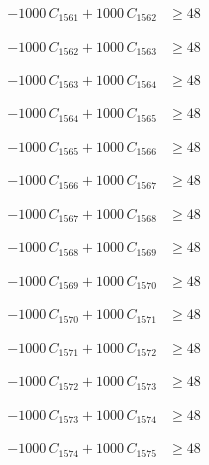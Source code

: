 \documentclass[a4paper,11pt]{article}
\begin{document}
\begin{align}
-1000\,C_{1561} + 1000\,C_{1562} &\geq 48 \nonumber
\end{align}

\begin{align}
-1000\,C_{1562} + 1000\,C_{1563} &\geq 48 \nonumber
\end{align}

\begin{align}
-1000\,C_{1563} + 1000\,C_{1564} &\geq 48 \nonumber
\end{align}

\begin{align}
-1000\,C_{1564} + 1000\,C_{1565} &\geq 48 \nonumber
\end{align}

\begin{align}
-1000\,C_{1565} + 1000\,C_{1566} &\geq 48 \nonumber
\end{align}

\begin{align}
-1000\,C_{1566} + 1000\,C_{1567} &\geq 48 \nonumber
\end{align}

\begin{align}
-1000\,C_{1567} + 1000\,C_{1568} &\geq 48 \nonumber
\end{align}

\begin{align}
-1000\,C_{1568} + 1000\,C_{1569} &\geq 48 \nonumber
\end{align}

\begin{align}
-1000\,C_{1569} + 1000\,C_{1570} &\geq 48 \nonumber
\end{align}

\begin{align}
-1000\,C_{1570} + 1000\,C_{1571} &\geq 48 \nonumber
\end{align}

\begin{align}
-1000\,C_{1571} + 1000\,C_{1572} &\geq 48 \nonumber
\end{align}

\begin{align}
-1000\,C_{1572} + 1000\,C_{1573} &\geq 48 \nonumber
\end{align}

\begin{align}
-1000\,C_{1573} + 1000\,C_{1574} &\geq 48 \nonumber
\end{align}

\begin{align}
-1000\,C_{1574} + 1000\,C_{1575} &\geq 48 \nonumber
\end{align}
\end{document}
